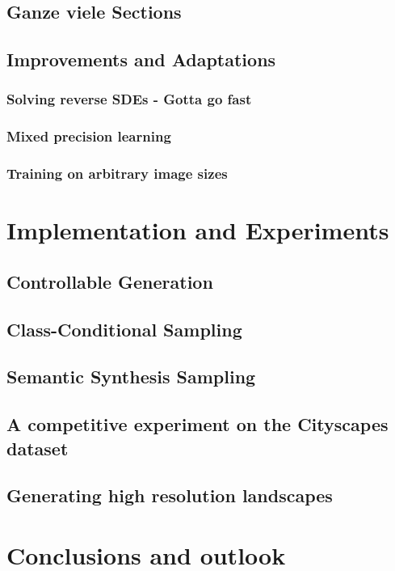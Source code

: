 \documentclass[a4paper, 12pt, oneside]{scrbook}
\begin{document}
\section{Ganze viele Sections}
\section{Improvements and Adaptations}
\subsection{Solving reverse SDEs - Gotta go fast} %
\subsection{Mixed precision learning} %
\subsection{Training on arbitrary image sizes} %

\chapter{Implementation and Experiments}
\section{Controllable Generation} %
\section{Class-Conditional Sampling} %
\section{Semantic Synthesis Sampling} %
\section{A competitive experiment on the Cityscapes dataset} %
\section{Generating high resolution landscapes} %

\chapter{Conclusions and outlook} %
\appendix 

\end{document}
